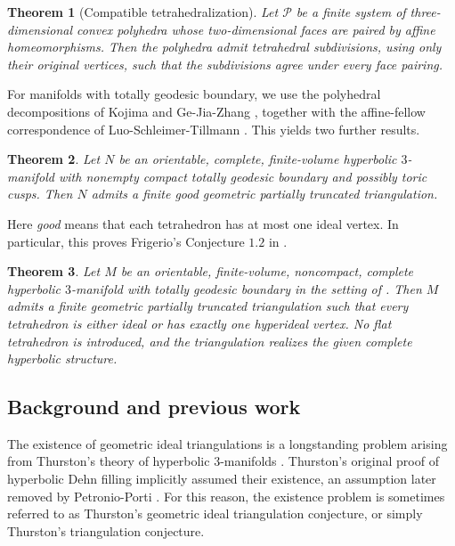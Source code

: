 \documentclass[oneside,a4paper,12pt]{article}
\theoremstyle{plain}
\newtheorem{theorem}{Theorem}[section]
\theoremstyle{definition}
\theoremstyle{remark}
\numberwithin{equation}{section}
\begin{document}
\begin{theorem}[Compatible tetrahedralization]
\label{main-2}
Let $\mathcal P$ be a finite system of three-dimensional convex polyhedra whose two-dimensional faces are paired by affine homeomorphisms. Then the polyhedra admit tetrahedral subdivisions, using only their original vertices, such that the subdivisions agree under every face pairing.
\end{theorem}

For manifolds with totally geodesic boundary, we use the polyhedral decompositions of Kojima \cite{Kojima} and Ge-Jia-Zhang \cite{GJZdecomp}, together with
the affine-fellow correspondence of Luo-Schleimer-Tillmann \cite{LST}. This yields two further results.


\begin{theorem}\label{main:boundary}
Let $N$ be an orientable, complete, finite-volume hyperbolic $3$-manifold with nonempty compact totally geodesic boundary and possibly toric cusps. Then $N$ admits a finite good geometric partially truncated triangulation.
\end{theorem}

Here \emph{good} means that each tetrahedron
has at most one ideal vertex. In particular, this proves Frigerio's Conjecture $1.2$ in \cite{Frigerio}.

\begin{theorem}\label{main:mixed}
Let $M$ be an orientable, finite-volume, noncompact, complete hyperbolic $3$-manifold with totally geodesic boundary in the setting of \cite{GJZdecomp}. Then $M$ admits a finite geometric partially truncated triangulation such that every tetrahedron is either ideal or has exactly one hyperideal vertex. No flat tetrahedron is introduced, and the triangulation realizes the given complete hyperbolic structure.
\end{theorem}

\subsection*{Background and previous work}
The existence of geometric ideal triangulations is a longstanding problem arising from Thurston's theory of hyperbolic $3$-manifolds \cite{Thurston}. Thurston's original proof of
hyperbolic Dehn filling implicitly assumed their existence, an assumption later removed by Petronio-Porti \cite{PP}. For this reason, the existence problem is sometimes referred to as Thurston's geometric ideal triangulation conjecture, or simply Thurston's triangulation conjecture.
\end{document}
